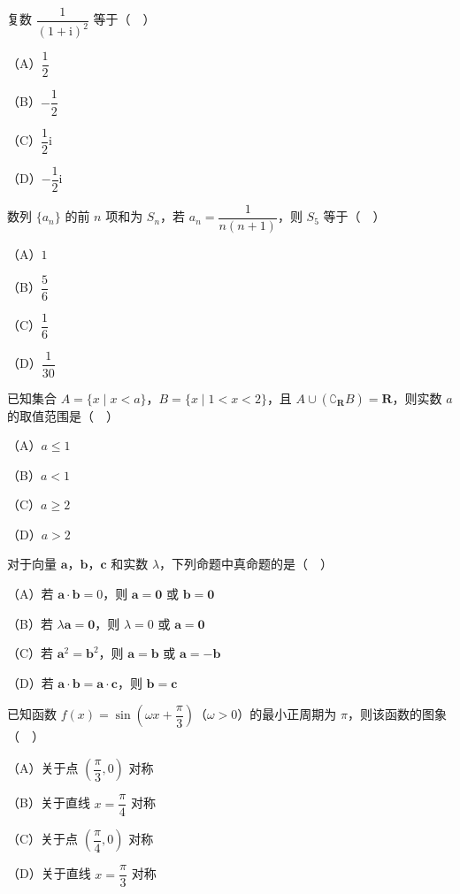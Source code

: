 


\begin{question}
复数 $\dfrac1{(1+\mathrm i)^2}$ 等于（　）

（A）$\dfrac12$

（B）$-\dfrac12$

（C）$\dfrac12\mathrm i$

（D）$-\dfrac12\mathrm i$

\end{question}
\begin{question}
数列 $\{a_n\}$ 的前 $n$ 项和为 $S_n$，若 $a_n=\dfrac1{n(n+1)}$，则 $S_5$ 等于（　）

（A）$1$

（B）$\dfrac56$

（C）$\dfrac16$

（D）$\dfrac1{30}$

\end{question}
\begin{question}
已知集合 $A=\{x\mid x<a\}$，$B=\{x\mid 1<x<2\}$，且 $A\cup(\complement_{\mathbf R}B)=\mathbf R$，则实数 $a$ 的取值范围是（　）

（A）$a\leqslant1$

（B）$a<1$

（C）$a\geqslant2$

（D）$a>2$

\end{question}
\begin{question}
对于向量 $\boldsymbol a$，$\boldsymbol b$，$\boldsymbol c$ 和实数 $\lambda$，下列命题中真命题的是（　）

（A）若 $\boldsymbol a\cdot\boldsymbol b=0$，则 $\boldsymbol a=\boldsymbol 0$ 或 $\boldsymbol b=\boldsymbol 0$

（B）若 $\lambda\boldsymbol a=\boldsymbol 0$，则 $\lambda=0$ 或 $\boldsymbol a=\boldsymbol 0$

（C）若 $\boldsymbol a^2=\boldsymbol b^2$，则 $\boldsymbol a=\boldsymbol b$ 或 $\boldsymbol a=-\boldsymbol b$

（D）若 $\boldsymbol a\cdot\boldsymbol b=\boldsymbol a\cdot\boldsymbol c$，则 $\boldsymbol b=\boldsymbol c$

\end{question}
\begin{question}
已知函数 $f(x)=\sin\left(\omega x+\dfrac{\pi}3\right)$（$\omega>0$）的最小正周期为 $\pi$，则该函数的图象（　）

（A）关于点 $\left(\dfrac{\pi}3,0\right)$ 对称

（B）关于直线 $x=\dfrac{\pi}4$ 对称

（C）关于点 $\left(\dfrac{\pi}4,0\right)$ 对称

（D）关于直线 $x=\dfrac{\pi}3$ 对称

\end{question}
